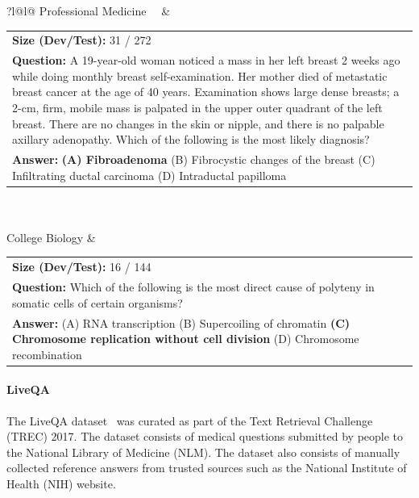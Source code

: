 \documentclass[10pt, letter, onecolumn]{arxiv}
\begin{document}
\begin{refsection}
\begin{table}[h]
\begin{tabular}{?l@{\hspace{.1em}}l@{\hspace{0.1em}}}
{\color{ourdarkblue}  Professional Medicine~~} &
{\color{ourdarkblue}  {\begin{tabular}[l]{@{}p{}}\textbf{Size (Dev/Test):} 31 / 272 \\ \textbf{Question:}  A 19-year-old woman noticed a mass in her left breast 2 weeks ago while doing monthly breast self-examination. Her mother died of metastatic breast cancer at the age of 40 years. Examination shows large dense breasts; a 2-cm, firm, mobile mass is palpated in the upper outer quadrant of the left breast. There are no changes in the skin or nipple, and there is no palpable axillary adenopathy. Which of the following is the most likely diagnosis?\\ \textbf{Answer:} \textbf{(A) Fibroadenoma} (B) Fibrocystic changes of the breast (C) Infiltrating ductal carcinoma (D) Intraductal papilloma\end{tabular}}} \\ \\
  
{\color{ourdarkblue}  College Biology} &
{\color{ourdarkblue}  {\begin{tabular}[l]{@{}p{}}\textbf{Size (Dev/Test):} 16 / 144 \\ \textbf{Question:}  Which of the following is the most direct cause of polyteny in somatic cells of certain organisms?\\ \textbf{Answer:} (A) RNA transcription (B) Supercoiling of chromatin  \textbf{(C) Chromosome replication without cell division} (D) Chromosome recombination \end{tabular}}}

\end{tabular}
\end{table}

\FloatBarrier

\paragraph{LiveQA} The LiveQA dataset~\cite{abacha2017overview} was curated as part of the Text Retrieval Challenge (TREC) 2017. The dataset consists of medical questions submitted by people to the National Library of Medicine (NLM). The dataset also consists of manually collected reference answers from trusted sources such as the National Institute of Health (NIH) website.



\end{refsection}
\end{document}
